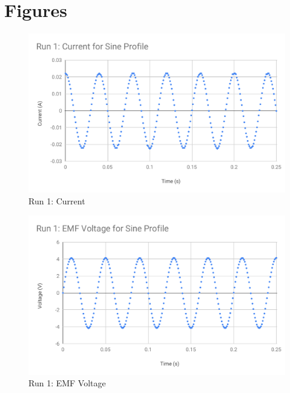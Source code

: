 \section{Figures}
\begin{figure}[ht]
	\centering
	\includegraphics[scale=0.74]{image/04-faraday/run-1-I.pdf}
	\caption{Run 1: Current}
	\label{figure.04.run.1.I}
\end{figure}
\begin{figure}[ht]
	\centering
	\includegraphics[scale=0.74]{image/04-faraday/run-1-V.pdf}
	\caption{Run 1: EMF Voltage}
	\label{figure.04.run.1.V}
\end{figure}
